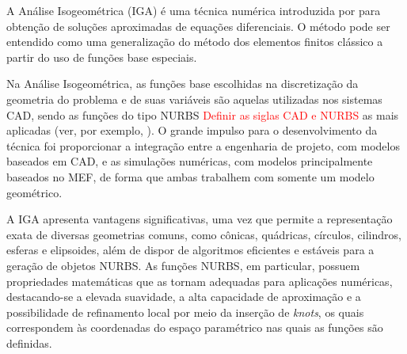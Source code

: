 \documentclass[tese_patricia]{subfiles}
\begin{document}


A Análise Isogeométrica (IGA) é uma técnica numérica introduzida por  para obtenção de soluções aproximadas de equações diferenciais. O método pode ser entendido como uma generalização do método dos elementos finitos clássico a partir do uso de funções base especiais. 

Na Análise Isogeométrica, as funções base escolhidas na discretização da geometria do problema e de suas variáveis são aquelas utilizadas nos sistemas CAD, sendo as funções do tipo NURBS \textcolor{red}{Definir as siglas CAD e NURBS} as mais aplicadas (ver, por exemplo, ). O grande impulso para o desenvolvimento da técnica foi proporcionar a integração entre a engenharia de projeto, com modelos baseados em CAD, e as simulações numéricas, com modelos principalmente baseados no MEF, de forma que ambas trabalhem com somente um modelo geométrico.

A IGA apresenta vantagens significativas, uma vez que permite a representação exata de diversas geometrias comuns, como cônicas, quádricas, círculos, cilindros, esferas e elipsoides, além de dispor de algoritmos eficientes e estáveis para a geração de objetos NURBS. As funções NURBS, em particular, possuem propriedades matemáticas que as tornam adequadas para aplicações numéricas, destacando-se a elevada suavidade, a alta capacidade de aproximação e a possibilidade de refinamento local por meio da inserção de \textit{knots}, os quais correspondem às coordenadas do espaço paramétrico nas quais as funções são definidas.
\end{document}
